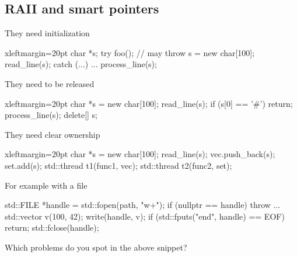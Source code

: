 \subsection[RAII]{RAII and smart pointers}

\begin{frame}[fragile]
  \begin{exampleblock}{They need initialization
      \hfill {}}
    \begin{cppcode*}{xleftmargin=20pt}
      char *s;
      try {
        foo(); // may throw
        s = new char[100];
        read_line(s);
      } catch (...) { ... }
      process_line(s);
    \end{cppcode*}
  \end{exampleblock}
  \pause
  \pause
  \vspace{-2cm}
  \begin{exampleblock}{They need to be released
      \hfill {}}
    \begin{cppcode*}{xleftmargin=20pt}
      char *s = new char[100];
      read_line(s);
      if (s[0] == '#') return;
      process_line(s);
      delete[] s;
    \end{cppcode*}
  \end{exampleblock}
  \pause
  \pause
  \vspace{-2cm}
  \begin{exampleblock}{They need clear ownership
      \hfill {}}
    \begin{cppcode*}{xleftmargin=20pt}
      char *s = new char[100];
      read_line(s);
      vec.push_back(s);
      set.add(s);
      std::thread t1(func1, vec);
      std::thread t2(func2, set);
    \end{cppcode*}
  \end{exampleblock}
\end{frame}

\begin{frame}[fragile]
  \begin{exampleblock}{For example with a file}
    \begin{cppcode*}{}
      std::FILE *handle = std::fopen(path, "w+");
      if (nullptr == handle) { throw ... }
      std::vector v(100, 42);
      write(handle, v);
      if (std::fputs("end", handle) == EOF) {
        return;
      }
      std::fclose(handle);
    \end{cppcode*}
  \end{exampleblock}
  \begin{block}{}
    Which problems do you spot in the above snippet?
  \end{block}
\end{frame}

